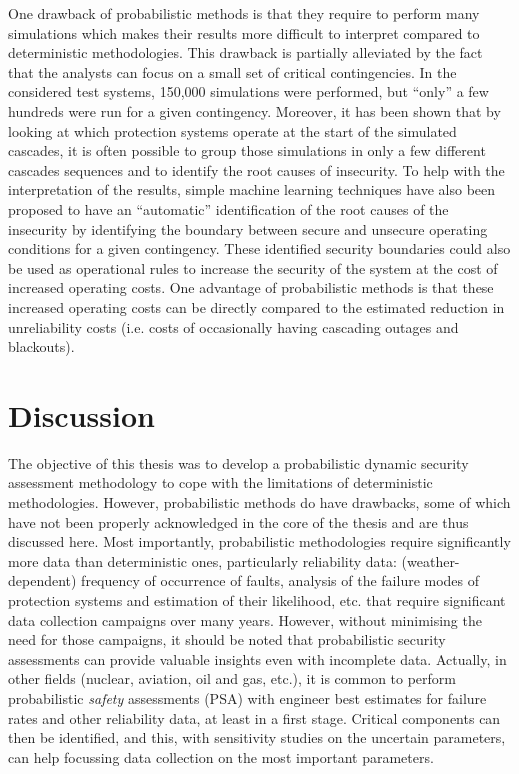 One drawback of probabilistic methods is that they require to perform many simulations which makes their results more difficult to interpret compared to deterministic methodologies. This drawback is partially alleviated by the fact that the analysts can focus on a small set of critical contingencies. In the considered test systems, 150,000 simulations were performed, but ``only'' a few hundreds were run for a given contingency. Moreover, it has been shown that by looking at which protection systems operate at the start of the simulated cascades, it is often possible to group those simulations in only a few different cascades sequences and to identify the root causes of insecurity. To help with the interpretation of the results, simple machine learning techniques have also been proposed to have an ``automatic'' identification of the root causes of the insecurity by identifying the boundary between secure and unsecure operating conditions for a given contingency. These identified security boundaries could also be used as operational rules to increase the security of the system at the cost of increased operating costs. One advantage of probabilistic methods is that these increased operating costs can be directly compared to the estimated reduction in unreliability costs (i.e. costs of occasionally having cascading outages and blackouts).

\section{Discussion}

The objective of this thesis was to develop a probabilistic dynamic security assessment methodology to cope with the limitations of deterministic methodologies. However, probabilistic methods do have drawbacks, some of which have not been properly acknowledged in the core of the thesis and are thus discussed here. Most importantly, probabilistic methodologies require significantly more data than deterministic ones, particularly reliability data: (weather-dependent) frequency of occurrence of faults, analysis of the failure modes of protection systems and estimation of their likelihood, etc. that require significant data collection campaigns over many years. However, without minimising the need for those campaigns, it should be noted that probabilistic security assessments can provide valuable insights even with incomplete data. Actually, in other fields (nuclear, aviation, oil and gas, etc.), it is common to perform probabilistic \emph{safety} assessments (PSA) with engineer best estimates for failure rates and other reliability data, at least in a first stage. Critical components can then be identified, and this, with sensitivity studies on the uncertain parameters, can help focussing data collection on the most important parameters.

